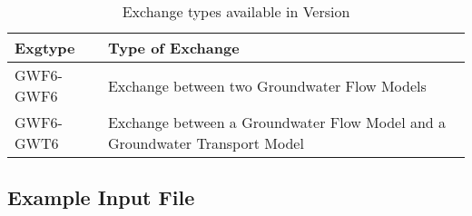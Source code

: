 \begin{table}[h]
\caption{Exchange types available in Version \modflowversion}
\small
\begin{center}
\begin{tabular*}{\columnwidth}{l p{15cm}}
\hline
\hline
Exgtype & Type of Exchange \\
\hline
GWF6-GWF6 & Exchange between two Groundwater Flow Models \\
GWF6-GWT6 & Exchange between a Groundwater Flow Model and a Groundwater Transport Model \\
\hline 
\end{tabular*}
\label{table:exgtype}
\end{center}
\normalsize
\end{table}

\vspace{5mm}
\subsection{Example Input File}


